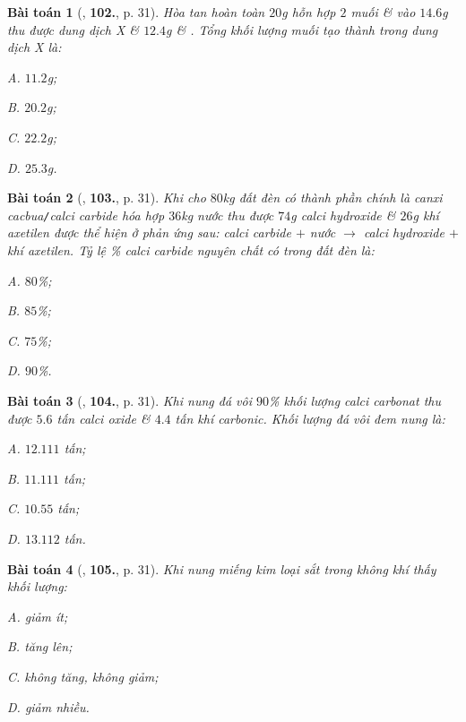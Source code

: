 \documentclass{article}
\numberwithin{equation}{section}
\newtheorem{baitoan}{Bài toán}
\begin{document}
\begin{baitoan}[\cite{An2011}, \textbf{102.}, p. 31]
	Hòa tan hoàn toàn $20$g hỗn hợp $2$ muối  \&  vào $14.6$g  thu được dung dịch X \& $12.4$g  \& . Tổng khối lượng muối tạo thành trong dung dịch X là:
	\begin{enumerate*}
		\item[{\rm\sf A.}] $11.2$g;
		\item[{\rm\sf B.}] $20.2$g;
		\item[{\rm\sf C.}] $22.2$g;
		\item[{\rm\sf D.}] $25.3$g.
	\end{enumerate*}
\end{baitoan}

\begin{baitoan}[\cite{An2011}, \textbf{103.}, p. 31]
	Khi cho $80$kg đất đèn có thành phần chính là canxi cacbua\emph{\texttt{/}}calci carbide hóa hợp $36$kg nước thu được $74$g calci hydroxide \& $26$g khí axetilen được  thể hiện ở phản ứng sau: calci carbide $+$ nước $\to$ calci hydroxide $+$ khí axetilen. Tỷ lệ \% calci carbide nguyên chất có trong đất đèn là:
	\begin{enumerate*}
		\item[{\rm\sf A.}] $80$\%;
		\item[{\rm\sf B.}] $85$\%;
		\item[{\rm\sf C.}] $75$\%;
		\item[{\rm\sf D.}] $90$\%.
	\end{enumerate*}
\end{baitoan}

\begin{baitoan}[\cite{An2011}, \textbf{104.}, p. 31]
	Khi nung đá vôi $90$\% khối lượng calci carbonat  thu được $5.6$ tấn calci oxide  \& $4.4$ tấn khí carbonic. Khối lượng đá vôi đem nung là:
	\begin{enumerate*}
		\item[{\rm\sf A.}] $12.111$ tấn;
		\item[{\rm\sf B.}] $11.111$ tấn;
		\item[{\rm\sf C.}] $10.55$ tấn;
		\item[{\rm\sf D.}] $13.112$ tấn.
	\end{enumerate*}
\end{baitoan}

\begin{baitoan}[\cite{An2011}, \textbf{105.}, p. 31]
	Khi nung miếng kim loại sắt trong không khí thấy khối lượng:
	\begin{enumerate*}
		\item[{\rm\sf A.}] giảm ít;
		\item[{\rm\sf B.}] tăng lên;
		\item[{\rm\sf C.}] không tăng, không giảm;
		\item[{\rm\sf D.}] giảm nhiều.
	\end{enumerate*}
\end{baitoan}
\end{document}
